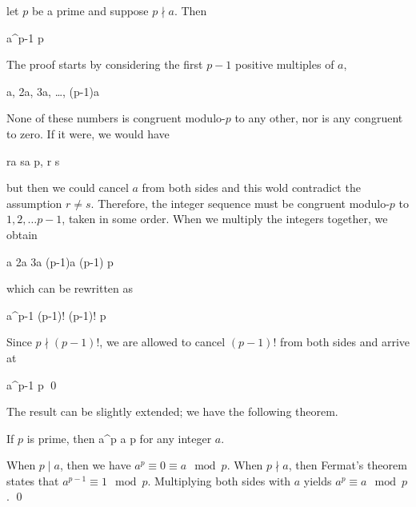 
\begin{theorem}
    let $p$ be a prime and suppose $p \nmid a$. Then

    \bee
        a^{p-1}  \mod p
    \eee
\end{theorem}

The proof starts by considering the first $p-1$ positive multiples of $a$,

\bee
a, 2a, 3a, \ldots, (p-1)a
\eee

None of these numbers is congruent modulo-$p$ to any other, nor is any congruent to zero. If it were, we would have

\bee
ra \equiv sa \mod p, \quad r \neq s
\eee

but then we could cancel $a$ from both sides and this wold contradict the assumption $r \neq s$. Therefore, the integer sequence must be congruent modulo-$p$ to $1, 2, \ldots p-1$, taken in some order. When we multiply the integers together, we obtain

\bee
a \cdot 2a \cdot 3a \cdots (p-1)a    \cdots (p-1) \mod p
\eee

which can be rewritten as

\bee
a^{p-1} (p-1)! \equiv (p-1)! \mod p
\eee

Since $p \nmid (p-1)!$, we are allowed to cancel $(p-1)!$ from both sides and arrive at

\bee
a^{p-1}  \mod p \qed
\eee

The result can be slightly extended; we have the following theorem.

\begin{theorem}
    If $p$ is prime, then 
    \bee
    a^p \equiv a \mod p
    \eee
    for any integer $a$.
\end{theorem}

When $p \mid a$, then we have $a^p \equiv 0 \equiv a \mod p$. When $p \nmid a$, then Fermat's theorem states that $a^{p-1} \equiv 1 \mod p$. Multiplying both sides with $a$ yields $a^p \equiv a \mod p$. \qed


